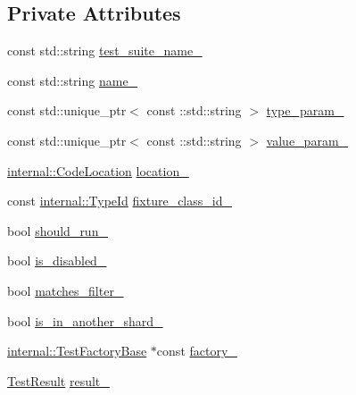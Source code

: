 \subsection*{Private Attributes}
\begin{DoxyCompactItemize}
\item 
const std\+::string \mbox{\hyperlink{classtesting_1_1_test_info_ac5beda04eb320588955c8954dc6c2eb0}{test\+\_\+suite\+\_\+name\+\_\+}}
\item 
const std\+::string \mbox{\hyperlink{classtesting_1_1_test_info_a6bed52b7c3d66c8c5eac5fa2aaadba55}{name\+\_\+}}
\item 
const std\+::unique\+\_\+ptr$<$ const \+::std\+::string $>$ \mbox{\hyperlink{classtesting_1_1_test_info_a3cef8103e15f4e7808b517156757eac1}{type\+\_\+param\+\_\+}}
\item 
const std\+::unique\+\_\+ptr$<$ const \+::std\+::string $>$ \mbox{\hyperlink{classtesting_1_1_test_info_a93dc919b0d05f63b151cba634d7ad47b}{value\+\_\+param\+\_\+}}
\item 
\mbox{\hyperlink{structtesting_1_1internal_1_1_code_location}{internal\+::\+Code\+Location}} \mbox{\hyperlink{classtesting_1_1_test_info_a749494420174e6cf1949c7b411e8df6f}{location\+\_\+}}
\item 
const \mbox{\hyperlink{namespacetesting_1_1internal_a38c435cbab5f8b784e2e7f3356cab242}{internal\+::\+Type\+Id}} \mbox{\hyperlink{classtesting_1_1_test_info_ad3284b7b9ebe61cc31440694091450ae}{fixture\+\_\+class\+\_\+id\+\_\+}}
\item 
bool \mbox{\hyperlink{classtesting_1_1_test_info_a89c3d8fb8b565532c34d3123240fd5cf}{should\+\_\+run\+\_\+}}
\item 
bool \mbox{\hyperlink{classtesting_1_1_test_info_af3765fc4f811296e0699b0a26430a7c7}{is\+\_\+disabled\+\_\+}}
\item 
bool \mbox{\hyperlink{classtesting_1_1_test_info_a397686f82b6dd68a209ab7b50eeb4932}{matches\+\_\+filter\+\_\+}}
\item 
bool \mbox{\hyperlink{classtesting_1_1_test_info_a7db5fe84e625c2d5b60544e15fbb75a3}{is\+\_\+in\+\_\+another\+\_\+shard\+\_\+}}
\item 
\mbox{\hyperlink{classtesting_1_1internal_1_1_test_factory_base}{internal\+::\+Test\+Factory\+Base}} $\ast$const \mbox{\hyperlink{classtesting_1_1_test_info_acef255c848be1680dc198a1523695169}{factory\+\_\+}}
\item 
\mbox{\hyperlink{classtesting_1_1_test_result}{Test\+Result}} \mbox{\hyperlink{classtesting_1_1_test_info_a108fd469897a8d4e5c4361947a5ed785}{result\+\_\+}}

\end{DoxyCompactItemize}
